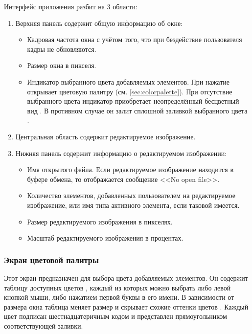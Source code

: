 \documentclass[a4paper,12pt]{article}
\begin{document}
  Интерфейс приложения разбит на 3 области: 
  \begin{enumerate}
    \item Верхняя панель содержит общую информацию об окне:
    \begin{itemize}
      \item Кадровая частота окна с учётом того, что при бездействие пользователя кадры не обновляются.
      \item Размер окна в пикселя.
      \item Индикатор выбранного цвета добавляемых элементов.
      При нажатие открывает цветовую палитру (см. \autoref{sec:colorpalette}).
      При отсутствие выбранного цвета индикатор приобретает неопределённый бесцветный вид . В противном случае он залит сплошной заливкой выбранного цвета .
    \end{itemize}
    \item Центральная область содержит редактируемое изображение.
    \item Нижняя панель содержит информацию о редактируемом изображении:
    \begin{itemize}
      \item Имя открытого файла. Если редактируемое изображение находится в буфере обмена, то отображается сообщение <<No open file>>.
      \item Количество элементов, добавленных пользователем на редактируемое изображение, или имя типа активного элемента, если таковой имеется.
      \item Размер редактируемого изображения в пикселях.
      \item Масштаб редактируемого изображения в процентах.
    \end{itemize}
  \end{enumerate}

  \subsubsection{Экран цветовой палитры}
  \label{sec:colorpalette}
  Этот экран предназначен для выбора цвета добавляемых элементов.
  Он содержит таблицу доступных цветов ,
  каждый из которых можно выбрать либо левой кнопкой мыши, либо нажатием первой буквы в его имени.
  В зависимости от размера окна таблица меняет размер и скрывает схожие оттенки цветов .
  Каждый цвет подписан шестнадцатеричным кодом и представлен прямоугольником соответствующей заливки.
\end{document}
